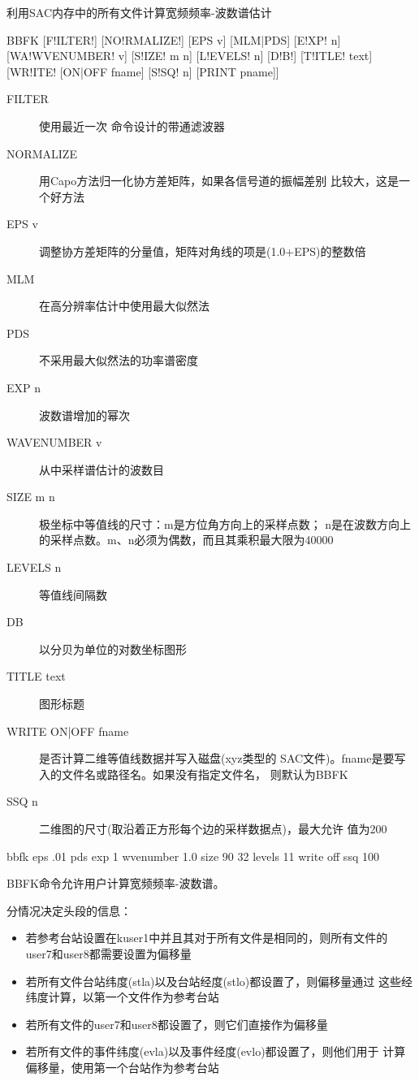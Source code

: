 \label{cmd:bbfk}

利用SAC内存中的所有文件计算宽频频率-波数谱估计

\begin{SACSTX}
BBFK [F!ILTER!] [NO!RMALIZE!] [EPS v] [MLM|PDS] [E!XP! n] [WA!WVENUMBER! v]
    [S!IZE! m n] [L!EVELS! n] [D!B!] [T!ITLE! text] [WR!ITE! [ON|OFF fname]
    [S!SQ! n] [PRINT pname]]
\end{SACSTX}

\begin{description}
\item [FILTER] 使用最近一次 命令设计的带通滤波器
\item [NORMALIZE] 用Capo方法归一化协方差矩阵，如果各信号道的振幅差别
    比较大，这是一个好方法
\item [EPS v] 调整协方差矩阵的分量值，矩阵对角线的项是(1.0+EPS)的整数倍
\item [MLM] 在高分辨率估计中使用最大似然法
\item [PDS] 不采用最大似然法的功率谱密度
\item [EXP n] 波数谱增加的幂次
\item [WAVENUMBER v] 从中采样谱估计的波数目
\item [SIZE m n] 极坐标中等值线的尺寸：m是方位角方向上的采样点数；
    n是在波数方向上的采样点数。m、n必须为偶数，而且其乘积最大限为40000
\item [LEVELS n] 等值线间隔数
\item [DB] 以分贝为单位的对数坐标图形
\item [TITLE text] 图形标题
\item [WRITE ON|OFF fname] 是否计算二维等值线数据并写入磁盘(xyz类型的
    SAC文件)。fname是要写入的文件名或路径名。如果没有指定文件名，
    则默认为BBFK
\item [SSQ n] 二维图的尺寸(取沿着正方形每个边的采样数据点)，最大允许
    值为200
\end{description}

\begin{SACDFT}
bbfk eps .01 pds exp 1 wvenumber 1.0 size 90 32 levels 11
    write off ssq 100
\end{SACDFT}

BBFK命令允许用户计算宽频频率-波数谱。

分情况决定头段的信息：
\begin{itemize}
\item 若参考台站设置在kuser1中并且其对于所有文件是相同的，则所有文件的
    user7和user8都需要设置为偏移量
\item 若所有文件台站纬度(stla)以及台站经度(stlo)都设置了，则偏移量通过
    这些经纬度计算，以第一个文件作为参考台站
\item 若所有文件的user7和user8都设置了，则它们直接作为偏移量
\item 若所有文件的事件纬度(evla)以及事件经度(evlo)都设置了，则他们用于
    计算偏移量，使用第一个台站作为参考台站
\end{itemize}

